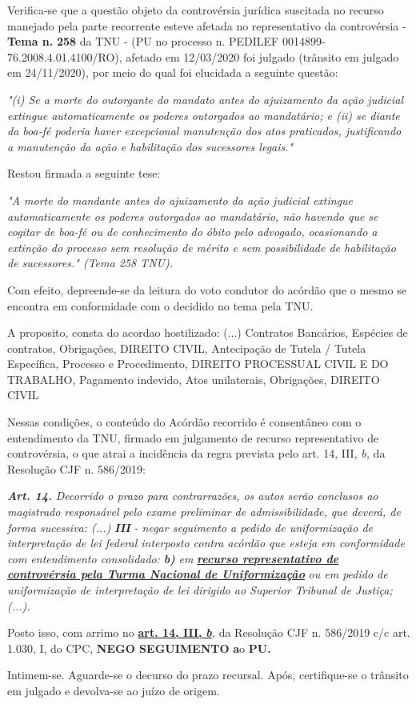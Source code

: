 \documentclass[12pt]{article}
\begin{document}
\justifying
\noindent Verifica-se que a questão objeto da controvérsia jurídica suscitada no recurso manejado pela parte recorrente esteve afetada no representativo da controvérsia - \textbf{Tema n. }\textbf{258} da TNU - (PU no processo n. PEDILEF 0014899-76.2008.4.01.4100/RO),  afetado em 12/03/2020 foi julgado (trânsito em julgado em 24/11/2020), por meio do qual foi elucidada a seguinte questão:

\noindent \textit{"(i) Se a morte do outorgante do mandato antes do ajuizamento da ação judicial extingue automaticamente os poderes outorgados ao mandatário; e (ii) se diante da boa-fé poderia haver excepcional manutenção dos atos praticados, justificando a manutenção da ação e habilitação dos sucessores legais."}

\noindent Restou firmada a seguinte tese:

\noindent \textit{"A morte do mandante antes do ajuizamento da ação judicial extingue automaticamente os poderes outorgados ao mandatário, não havendo que se cogitar de boa-fé ou de conhecimento do óbito pelo advogado, ocasionando a extinção do processo sem resolução de mérito e sem possibilidade de habilitação de sucessores." (Tema 258 TNU).}

\noindent Com efeito, depreende-se da leitura do voto condutor do acórdão que o mesmo se encontra em conformidade com o decidido no  tema pela TNU.

\noindent A proposito, consta do acordao hostilizado: (...) Contratos Bancários, Espécies de contratos, Obrigações, DIREITO CIVIL, Antecipação de Tutela / Tutela Específica, Processo e Procedimento, DIREITO PROCESSUAL CIVIL E DO TRABALHO, Pagamento indevido, Atos unilaterais, Obrigações, DIREITO CIVIL

\noindent Nessas condições, o conteúdo do Acórdão recorrido é consentâneo com o entendimento da TNU, firmado em julgamento de recurso representativo de controvérsia, o que atrai a incidência da regra prevista pelo art. 14, III, \textit{b,} da Resolução CJF n. 586/2019:

\noindent \textit{\textbf{Art. 14.}}\textit{ Decorrido o prazo para contrarrazões, os autos serão conclusos ao magistrado responsável pelo exame preliminar de admissibilidade, que deverá, de forma sucessiva: (...) }\textit{\textbf{III }}\textit{- negar seguimento a pedido de uniformização de interpretação de lei federal interposto contra acórdão que esteja em conformidade com entendimento consolidado: }\textit{\textbf{b)}}\textit{ em }\uline{\textit{\textbf{recurso representativo de controvérsia pela Turma Nacional de Uniformização}}}\textit{ ou em pedido de uniformização de interpretação de lei dirigido ao Superior Tribunal de Justiça;(...).}

\noindent Posto isso, com arrimo no \uline{\textbf{art. 14, III, }}\uline{\textit{\textbf{b}}}\textit{,} da Resolução CJF n. 586/2019 c/c art. 1.030, I, do CPC, \textbf{NEGO SEGUIMENTO }\textbf{a}o\textbf{ PU}\textbf{.}

\noindent Intimem-se. Aguarde-se o decurso do prazo recursal. Após, certifique-se o trânsito em julgado e devolva-se ao juízo de origem.
\end{document}
